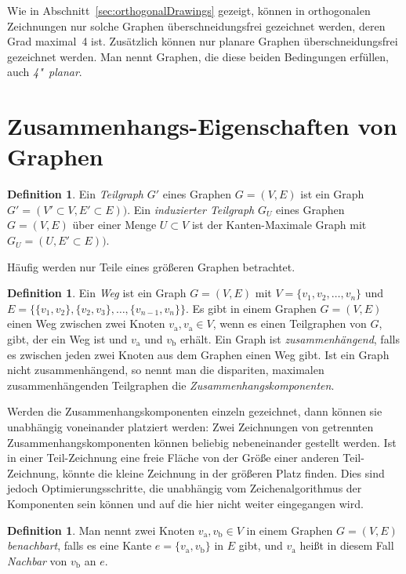 \documentclass[a4paper]{scrreprt}
\theoremstyle{definition}
\newtheorem{definition}[satz]{Definition}
\begin{document}
Wie in Abschnitt~\ref{sec:orthogonalDrawings} gezeigt, können in orthogonalen Zeichnungen nur solche Graphen überschneidungsfrei gezeichnet werden, deren Grad maximal~4 ist. Zusätzlich können nur planare Graphen überschneidungsfrei gezeichnet werden. Man nennt Graphen, die diese beiden Bedingungen erfüllen, auch \emph{4"~planar}.

\section{Zusammenhangs-Eigenschaften von Graphen}

\begin{definition}
  Ein \emph{Teilgraph} $G'$ eines Graphen $G=(V, E)$ ist ein Graph $G' = (V' \subset V, E' \subset E))$.
  Ein \emph{induzierter Teilgraph} $G_U$ eines Graphen $G=(V, E)$ über einer Menge $U \subset V$ ist der Kanten-Maximale Graph mit $G_U = (U , E' \subset E))$.
\end{definition}

Häufig werden nur Teile eines größeren Graphen betrachtet. %

\begin{definition}
  Ein \emph{Weg} ist ein Graph $G = (V, E)$ mit $V = \{v_1, v_2, \dots, v_n\}$ und $E = \{\{v_1, v_2\}, \{v_2, v_3\}, \dots, \{v_{n-1}, v_{n}\}\}$.
  Es gibt in einem Graphen $G = (V, E)$ einen Weg zwischen zwei Knoten $v_\text{a}, v_\text{a} \in V$, wenn es einen Teilgraphen von $G$, gibt, der ein Weg ist und $v_\text{a}$ und $v_\text{b}$ erhält.
  Ein Graph ist \emph{zusammenhängend}, falls es zwischen jeden zwei Knoten aus dem Graphen einen Weg gibt.
  Ist ein Graph nicht zusammenhängend, so nennt man die dispariten, maximalen zusammenhängenden Teilgraphen die \emph{Zusammenhangskomponenten}.
\end{definition}

Werden die Zusammenhangskomponenten einzeln gezeichnet, dann können sie unabhängig voneinander platziert werden: Zwei Zeichnungen von getrennten Zusammenhangskomponenten können beliebig nebeneinander gestellt werden. Ist in einer Teil-Zeichnung eine freie Fläche von der Größe einer anderen Teil-Zeichnung, könnte die kleine Zeichnung in der größeren Platz finden. Dies sind jedoch Optimierungsschritte, die unabhängig vom Zeichenalgorithmus der Komponenten sein können und auf die hier nicht weiter eingegangen wird.

\begin{definition}
  Man nennt zwei Knoten $v_\text{a}, v_\text{b} \in V$ in einem Graphen $G = (V, E)$ \emph{benachbart}, falls es eine Kante $e = \{v_\text{a}, v_\text{b}\}$ in $E$ gibt, und $v_\text{a}$ heißt in diesem Fall \emph{Nachbar} von $ v_\text{b}$ an $e$. 
\end{definition}
\end{document}
